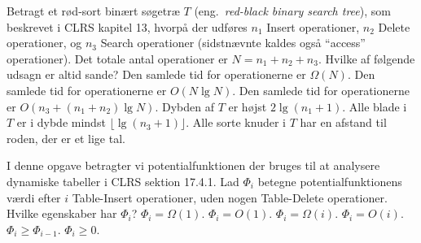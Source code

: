 Betragt et rød-sort binært søgetræ $T$ (eng.~\emph{red-black binary search tree}), som beskrevet i CLRS kapitel 13,
hvorpå der udføres $n_1$ {\sc Insert} operationer, $n_2$ {\sc Delete} operationer, og $n_3$ {\sc Search} operationer (sidstnævnte kaldes også ``access'' operationer).
Det totale antal operationer er $N=n_1+n_2+n_3$.
Hvilke af følgende udsagn er altid sande?
\fleresvar
\mulighederstart
\svar Den samlede tid for operationerne er $\Omega(N)$. \korrekt
\svar Den samlede tid for operationerne er $O(N \lg N)$. \korrekt
\svar Den samlede tid for operationerne er $O(n_3 + (n_1 + n_2) \lg N)$.
\svar Dybden af $T$ er højst $2\lg(n_1 + 1)$. \korrekt
\svar Alle blade i $T$ er i dybde mindst $\lfloor \lg(n_3 + 1)\rfloor$.
\svar Alle sorte knuder i $T$ har en afstand til roden, der er et lige tal.
\mulighederslut
{}



I denne opgave betragter vi potentialfunktionen der bruges til at analysere dynamiske tabeller i CLRS sektion 17.4.1.
Lad $\Phi_i$ betegne potentialfunktionens værdi efter $i$ {\sc Table-Insert} operationer, uden nogen {\sc Table-Delete} operationer.
Hvilke egenskaber har $\Phi_i$?
\fleresvar
\mulighederstart
\svar $\Phi_i = \Omega(1)$.\korrekt
\svar $\Phi_i = O(1)$.
\svar $\Phi_i = \Omega(i)$.
\svar $\Phi_i = O(i)$.\korrekt
\svar $\Phi_{i} \geq \Phi_{i-1}$.
\svar $\Phi_{i} \geq 0$. \korrekt
\mulighederslut
{}


